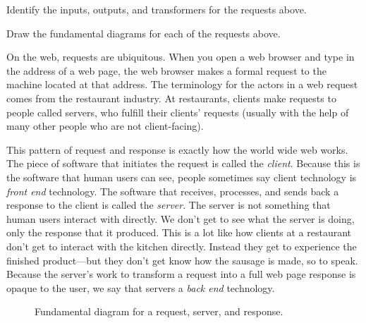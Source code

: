 \begin{question}
  Identify the inputs, outputs, and transformers for the requests above.
\end{question}

\begin{question}
  Draw the fundamental diagrams for each of the requests above.
\end{question}

On the web, requests are ubiquitous. When you open a web browser and type in the address of a web page, the web browser makes a formal request to the machine located at that address.  The terminology for the actors in a web request comes from the restaurant industry. At restaurants, clients make requests to people called servers, who fulfill their clients' requests (usually with the help of many other people who are not client-facing).

This pattern of request and response is exactly how the world wide web works. The piece of software that initiates the request is called the \emph{client}. Because this is the software that human users can see, people sometimes say client technology is \emph{front end} technology. The software that receives, processes, and sends back a response to the client is called the \emph{server}. The server is not something that human users interact with directly. We don't get to see what the server is doing, only the response that it produced. This is a lot like how clients at a restaurant don't get to interact with the kitchen directly. Instead they get to experience the finished product---but they don't get know how the sausage is made, so to speak. Because the server's work to transform a request into a full web page response is opaque to the user, we say that servers a \emph{back end} technology.

\begin{figure}[h]
  
  \caption{\label{fig:intro-example-request-response} Fundamental diagram for a request, server, and response.}
\end{figure}

